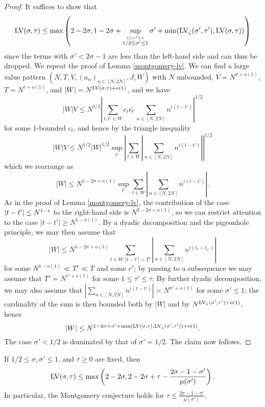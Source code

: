 \begin{proof} It suffices to show that
 $$ \mathrm{LV}(\sigma,\tau) \leq \max\left(2-2\sigma, 1 - 2\sigma + \sup_{\stackrel{1 \leq \tau' \leq \tau}{1/2 \leq \sigma' \leq 1}}  \sigma' + \min(\mathrm{LV}_\zeta(\sigma',\tau'), \mathrm{LV}(\sigma,\tau)) \right)$$
since the terms with $\sigma' < 2\sigma-1$ are less than the left-hand side and can thus be dropped.
    We repeat the proof of Lemma \ref{montgomery-lv}.  We can find a large value pattern $(N,T,V,(a_n)_{n \in [N,2N]},J,W)$ with $N$ unbounded, $V = N^{\sigma+o(1)}$, $T = N^{\tau+o(1)}$, and $|W| = N^{\mathrm{LV}(\sigma,\tau)+o(1)}$, and we have
    $$ |W|V \leq N^{1/2} \left|\sum_{t,t' \in W} c_t \overline{c_{t'}} \sum_{n \in [N,2N]} n^{i(t-t')} \right|^{1/2}$$
    for some $1$-bounded $c_t$, and hence by the triangle inequality
    $$ |W|V \leq N^{1/2} |W|^{1/2} \sup_{t'} \left|\sum_{t \in W} |\sum_{n \in [N,2N]} n^{i(t-t')}| \right|^{1/2}$$
    which we rearrange as
    $$ |W| \leq N^{1-2\sigma+o(1)} \sup_{t'} \sum_{t \in W} |\sum_{n \in [N,2N]} n^{i(t-t')}|.$$
    As in the proof of Lemma \ref{montgomery-lv}, the contribution of the case $|t - t'| \leq N^{1-\varepsilon}$ to the right-hand side is $N^{2-2\sigma+o(1)}$, so we can restrict attention to the case $|t - t'| \geq N^{1-o(1)}$.  By a dyadic decomposition and the pigeonhole principle, we may then assume that
    $$ |W| \leq N^{1-2\sigma+o(1)} \sum_{t \in W: |t - t'| \asymp T'} |\sum_{n \in [N,2N]} n^{i(t_r-t_{r'})}|$$
    for some $N^{1-o(1)} \ll T' \ll T$ and some $r'$; by passing to a subsequence we may assume that $T' = N^{\tau'+o(1)}$ for some $1 \leq \tau' \leq \tau$.  By further dyadic decomposition, we may also assume that
    $ |\sum_{n \in [N,2N]} n^{i(t-t')}| \asymp N^{\sigma'+o(1)}$
    for some $\sigma' \leq 1$; the cardinality of the sum is then bounded both by $|W|$ and by $N^{\mathrm{LV}_\zeta(\sigma',\tau') + o(1)}$,
    hence
    $$ |W| \leq N^{1-2\sigma+\sigma' + \min( \mathrm{LV}(\sigma,\tau), \mathrm{LV}_\zeta(\sigma',\tau') ) + o(1)}.$$
    The case $\sigma' < 1/2$ is dominated by that of $\sigma'=1/2$.  The claim now follows.
\end{proof}

\begin{corollary}\label{mu-lv}  If $1/2 \leq \sigma, \sigma' \leq 1$, and $\tau \geq 0$ are fixed, then
    $$\mathrm{LV}(\sigma,\tau) \leq \max\left( 2-2\sigma, 2 - 2\sigma + \tau - \frac{2\sigma-1-\sigma'}{\mu(\sigma')} \right).$$
    In particular, the Montgomery conjecture holds for $\tau \leq \frac{2\sigma-1-\sigma'}{\mu(\sigma')}$.
\end{corollary}

